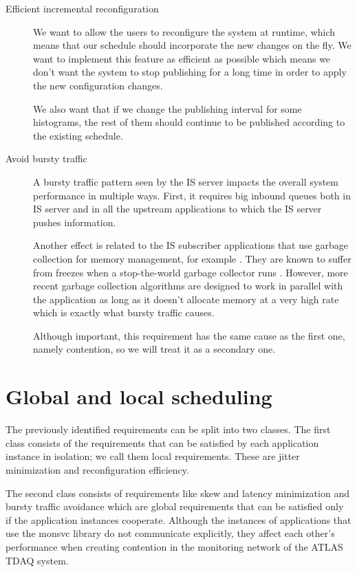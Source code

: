 \begin{description}
\item [Efficient incremental reconfiguration]

We want to allow the users to reconfigure the system at runtime, which means that our schedule should incorporate the new changes on the fly. We want to implement this feature as efficient as possible which means we don’t want the system to stop publishing for a long time in order to apply the new configuration changes. 

We also want that if we change the publishing interval for some histograms, the rest of them should continue to be published according to the existing schedule.

\item [Avoid bursty traffic]

A bursty traffic pattern seen by the IS server impacts the overall system performance in multiple ways. First, it requires big inbound queues both in IS server and in all the upstream applications to which the IS server pushes information. 

Another effect is related to the IS subscriber applications that use garbage collection for memory management, for example \citep{sicoe2012persistent}. They are known to suffer from freezes when a stop-the-world garbage collector runs \citep{aho2007compilers}. However, more recent garbage collection algorithms \citep{printezis2005garbage} are designed to work in parallel with the application as long as it doesn’t allocate memory at a very high rate which is exactly what bursty traffic causes.

Although important, this requirement has the same cause as the first one, namely contention, so we will treat it as a secondary one.

\end{description}

\section*{Global and local scheduling}

The previously identified requirements can be split into two classes. The first class consists of the requirements that can be satisfied by each application instance in isolation; we call them local requirements. These are jitter minimization and reconfiguration efficiency. 

The second class consists of requirements like skew and latency minimization and bursty traffic avoidance which are global requirements that can be satisfied only if the application instances cooperate. Although the instances of applications that use the monsvc library do not communicate explicitly, they affect each other’s performance when creating contention in the monitoring network of the ATLAS TDAQ system. 

